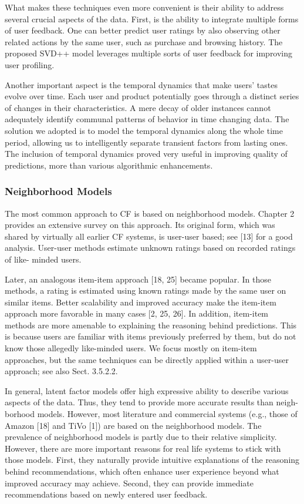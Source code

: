 What makes these techniques even more convenient is their ability to address several crucial aspects of the data. First, is the ability to integrate multiple forms of user feedback. One can better predict user ratings by also observing other related actions by the same user, such as purchase and browsing history. The proposed SVD++ model leverages multiple sorts of user feedback for improving user profiling.

Another important aspect is the temporal dynamics that make users’ tastes evolve over time. Each user and product potentially goes through a distinct series of changes in their characteristics. A mere decay of older instances cannot adequately identify communal patterns of behavior in time changing data. The solution we adopted is to model the temporal dynamics along the whole time period, allowing us to intelligently separate transient factors from lasting ones. The inclusion of temporal dynamics proved very useful in improving quality of predictions, more than various algorithmic enhancements.

\subsubsection{Neighborhood Models}

The most common approach to CF is based on neighborhood models. Chapter 2 provides an extensive survey on this approach. Its original form, which was shared by virtually all earlier CF systems, is user-user based; see [13] for a good analysis. User-user methods estimate unknown ratings based on recorded ratings of like- minded users.

Later, an analogous item-item approach [18, 25] became popular. In those methods, a rating is estimated using known ratings made by the same user on similar items. Better scalability and improved accuracy make the item-item approach more favorable in many cases [2, 25, 26]. In addition, item-item methods are more amenable to explaining the reasoning behind predictions. This is because users are familiar with items previously preferred by them, but do not know those allegedly like-minded users. We focus mostly on item-item approaches, but the same techniques can be directly applied within a user-user approach; see also Sect. 3.5.2.2.

In general, latent factor models offer high expressive ability to describe various aspects of the data. Thus, they tend to provide more accurate results than neigh- borhood models. However, most literature and commercial systems (e.g., those of Amazon [18] and TiVo [1]) are based on the neighborhood models. The prevalence of neighborhood models is partly due to their relative simplicity. However, there are more important reasons for real life systems to stick with those models. First, they naturally provide intuitive explanations of the reasoning behind recommendations, which often enhance user experience beyond what improved accuracy may achieve. Second, they can provide immediate recommendations based on newly entered user feedback.

